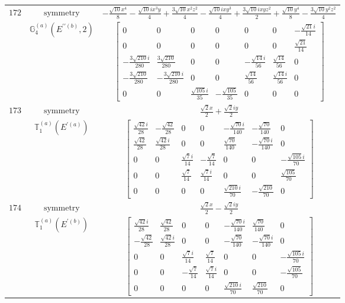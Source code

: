 \documentclass[fleqn,8pt,landscape]{jsarticle}
\begin{document}
\begin{longtable}{ccc}
$ 172 $ & $ \text{symmetry} $ & $ - \frac{\sqrt{10} x^{4}}{8} - \frac{\sqrt{10} i x^{3} y}{4} + \frac{3 \sqrt{10} x^{2} z^{2}}{4} - \frac{\sqrt{10} i x y^{3}}{4} + \frac{3 \sqrt{10} i x y z^{2}}{2} + \frac{\sqrt{10} y^{4}}{8} - \frac{3 \sqrt{10} y^{2} z^{2}}{4} $ \\
$  $ & $ \mathbb{G}_{4}^{(a)}(E^{\prime\prime(b)},2) $ & $ \begin{bmatrix} 0 & 0 & 0 & 0 & 0 & 0 & - \frac{\sqrt{21} i}{14} \\ 0 & 0 & 0 & 0 & 0 & 0 & \frac{\sqrt{21}}{14} \\ - \frac{3 \sqrt{210} i}{280} & \frac{3 \sqrt{210}}{280} & 0 & 0 & - \frac{\sqrt{14} i}{56} & \frac{\sqrt{14}}{56} & 0 \\ - \frac{3 \sqrt{210}}{280} & - \frac{3 \sqrt{210} i}{280} & 0 & 0 & \frac{\sqrt{14}}{56} & \frac{\sqrt{14} i}{56} & 0 \\ 0 & 0 & \frac{\sqrt{105} i}{35} & - \frac{\sqrt{105}}{35} & 0 & 0 & 0 \end{bmatrix} $ \\ \hline
$ 173 $ & $ \text{symmetry} $ & $ \frac{\sqrt{2} x}{2} + \frac{\sqrt{2} i y}{2} $ \\
$  $ & $ \mathbb{T}_{1}^{(a)}(E^{\prime(a)}) $ & $ \begin{bmatrix} \frac{\sqrt{42} i}{28} & - \frac{\sqrt{42}}{28} & 0 & 0 & - \frac{\sqrt{70} i}{140} & - \frac{\sqrt{70}}{140} & 0 \\ \frac{\sqrt{42}}{28} & \frac{\sqrt{42} i}{28} & 0 & 0 & \frac{\sqrt{70}}{140} & - \frac{\sqrt{70} i}{140} & 0 \\ 0 & 0 & \frac{\sqrt{7} i}{14} & - \frac{\sqrt{7}}{14} & 0 & 0 & - \frac{\sqrt{105} i}{70} \\ 0 & 0 & \frac{\sqrt{7}}{14} & \frac{\sqrt{7} i}{14} & 0 & 0 & \frac{\sqrt{105}}{70} \\ 0 & 0 & 0 & 0 & \frac{\sqrt{210} i}{70} & - \frac{\sqrt{210}}{70} & 0 \end{bmatrix} $ \\ \hline
$ 174 $ & $ \text{symmetry} $ & $ \frac{\sqrt{2} x}{2} - \frac{\sqrt{2} i y}{2} $ \\
$  $ & $ \mathbb{T}_{1}^{(a)}(E^{\prime(b)}) $ & $ \begin{bmatrix} \frac{\sqrt{42} i}{28} & \frac{\sqrt{42}}{28} & 0 & 0 & - \frac{\sqrt{70} i}{140} & \frac{\sqrt{70}}{140} & 0 \\ - \frac{\sqrt{42}}{28} & \frac{\sqrt{42} i}{28} & 0 & 0 & - \frac{\sqrt{70}}{140} & - \frac{\sqrt{70} i}{140} & 0 \\ 0 & 0 & \frac{\sqrt{7} i}{14} & \frac{\sqrt{7}}{14} & 0 & 0 & - \frac{\sqrt{105} i}{70} \\ 0 & 0 & - \frac{\sqrt{7}}{14} & \frac{\sqrt{7} i}{14} & 0 & 0 & - \frac{\sqrt{105}}{70} \\ 0 & 0 & 0 & 0 & \frac{\sqrt{210} i}{70} & \frac{\sqrt{210}}{70} & 0 \end{bmatrix} $ \\ \hline

\end{longtable}
\end{document}
